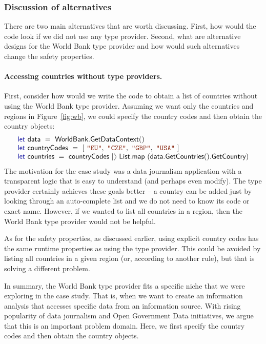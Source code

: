 \documentclass[submission,copyright,creativecommons]{eptcs}
\newcommand{\rangl}{\begin{picture}(4.5,7)
\put(.9,2.5){\rotatebox{120}{\line(1,0){5.5}}}
\put(.9,2.5){\rotatebox{240}{\line(1,0){5.5}}}
\end{picture}}
\newcommand{\kvd}[1]{\textnormal{\textcolor{kvdclr}{\sffamily #1}}}
\newcommand{\str}[1]{\textnormal{\textcolor{strclr}{\ttfamily "#1"}}}
\newcommand{\ident}[1]{\textnormal{\sffamily #1}}
\begin{document}
\subsubsection{Discussion of alternatives}

There are two main alternatives that are worth discussing. First, how would the code look if 
we did not use any type provider. Second, what are alternative designs for the World Bank type 
provider and how would such alternatives change the safety properties. 

\vspace{-1em}
\paragraph{Accessing countries without type providers.} First, consider how would we write the code to obtain a list
of countries without using the World Bank type provider. Assuming we want only the countries and
regions in Figure~\ref{fig:wb}, we could specify the country codes and then obtain the country objects:
%
\begin{equation*}
\begin{array}{l}
 \kvd{let}~\ident{data}~=~\ident{WorldBank.GetDataContext}() \\
 \kvd{let}~\ident{countryCodes}~=~\lbrack~\str{EU},~\str{CZE},~\str{GBP},~\str{USA}~\rbrack \\
 \kvd{let}~\ident{countries}~=~\ident{countryCodes}~|\rangl~\ident{List.map}~(\ident{data.GetCountries}().\ident{GetCountry})
\end{array}
\end{equation*}
%
The motivation for the case study was a data journalism application with a transparent logic
that is easy to understand (and perhaps even modify). The type provider certainly achieves these
goals better -- a country can be added just by looking through an auto-complete list and we do not
need to know its code or exact name. However, if we wanted to list all countries in a region, then
the World Bank type provider would not be helpful. 

As for the safety properties, as discussed earlier, using explicit country codes has the same
runtime properties as using the type provider. This could be avoided by listing all countries in
a given region (or, according to another rule), but that is solving a different problem. 

In summary, the World Bank type provider fits a specific niche that we were exploring in the case 
study. That is, when we want to create an information analysis that accesses specific data from
an information source. With rising popularity of data journalism and Open Government Data
initiatives, we argue that this is an important problem domain. Here, we first specify the country 
codes and then obtain the country objects.
\end{document}
